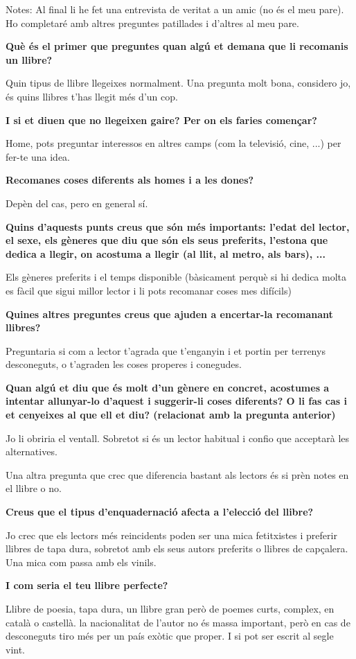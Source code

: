 \label{entrevista}

Notes: Al final li he fet una entrevista de veritat a un amic (no és el meu pare). Ho completaré amb altres preguntes patillades i d'altres al meu pare.


\textbf{Què és el primer que preguntes quan algú et demana que li recomanis un llibre?}

  Quin tipus de llibre llegeixes normalment. Una pregunta molt bona, considero jo, és quins llibres t'has llegit més d'un cop.

\textbf{I si et diuen que no llegeixen gaire? Per on els faries començar?}

  Home, pots preguntar interessos en altres camps (com la televisió, cine, ...) per fer-te una idea.

\textbf{Recomanes coses diferents als homes i a les dones?}

  Depèn del cas, pero en general sí.

\textbf{Quins d'aquests punts creus que són més importants: l'edat del lector, el sexe, els gèneres que diu que són els seus preferits, l'estona que dedica a llegir, on acostuma a llegir (al llit, al metro, als bars), ...}

  Els gèneres preferits i el temps disponible (bàsicament perquè si hi dedica molta es fàcil que sigui millor lector i li pots recomanar coses mes difícils)

\textbf{Quines altres preguntes creus que ajuden a encertar-la recomanant llibres?}

Preguntaria si com a lector t'agrada que t'enganyin i et portin per terrenys desconeguts, o t'agraden les coses properes i conegudes.

\textbf{Quan algú et diu que és molt d'un gènere en concret, acostumes a intentar allunyar-lo d'aquest i suggerir-li coses diferents? O li fas cas i et cenyeixes al que ell et diu? (relacionat amb la pregunta anterior)}

 Jo li obriria el ventall. Sobretot si és un lector habitual i confio que acceptarà les alternatives.

 Una altra pregunta que crec que diferencia bastant als lectors és si prèn notes en el llibre o no.

\textbf{Creus que el tipus d'enquadernació afecta a l'elecció del llibre?}

  Jo crec que els lectors més reincidents poden ser una mica fetitxistes i preferir llibres de tapa dura, sobretot amb els seus autors preferits o llibres de capçalera. Una mica com passa amb els vinils.

\textbf{I com seria el teu llibre perfecte?}

  Llibre de poesia, tapa dura, un llibre gran però de poemes curts, complex, en català o castellà. la nacionalitat de l'autor no és massa important, però en cas de desconeguts tiro més per un país exòtic que proper. I si pot ser escrit al segle vint.
